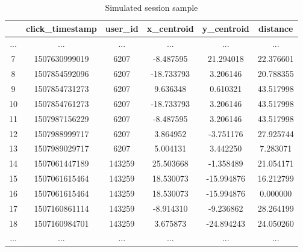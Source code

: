 \documentclass[ecp,tc,english]{iiufrgs}
\begin{document}
        \begin{table}[!ht]
            \centering
            \begin{tabular}{ |c|c|c|c|c|c| } 
                \hline
                \  & click\_timestamp & user\_id & x\_centroid & y\_centroid & distance \\
                \hline 
                 ... & ... & ... & ... & ... & ... \\
                 7 & 1507630999019 & 6207 & -8.487595 & 21.294018 & 22.376601 \\
                 8 & 1507854592096 & 6207 & -18.733793 & 3.206146 & 20.788355 \\
                 9 & 1507854731273 & 6207 & 9.636348 & 0.610321 & 43.517998 \\
                 10 & 1507854761273 & 6207 & -18.733793 & 3.206146 & 43.517998 \\
                 11 & 1507987156229 & 6207 & -8.487595 & 3.206146 & 43.517998 \\
                 12 & 1507988999717 & 6207 & 3.864952 & -3.751176 & 27.925744 \\
                 13 & 1507989029717 & 6207 & 5.004131 & 3.442250 & 7.283071 \\
                 \rowcolor[RGB]{220,220,220}
                 14 & 1507061447189 & 143259 & 25.503668 & -1.358489 & 21.054171 \\
                 15 & 1507061615464 & 143259 & 18.530073 & -15.994876 & 16.212799 \\
                 16 & 1507061615464 & 143259 & 18.530073 & -15.994876 & 0.000000 \\
                 17 & 1507160861114 & 143259 & -8.914310 & -9.236862 & 28.264199 \\
                 18 & 1507160984701 & 143259 & 3.675873 & -24.894243 & 24.050260 \\
                 ... & ... & ... & ... & ... & ... \\
                \hline
            \end{tabular}
            \caption{Simulated session sample}
            \label{tab:my_label}
        \end{table}
        
\end{document}
